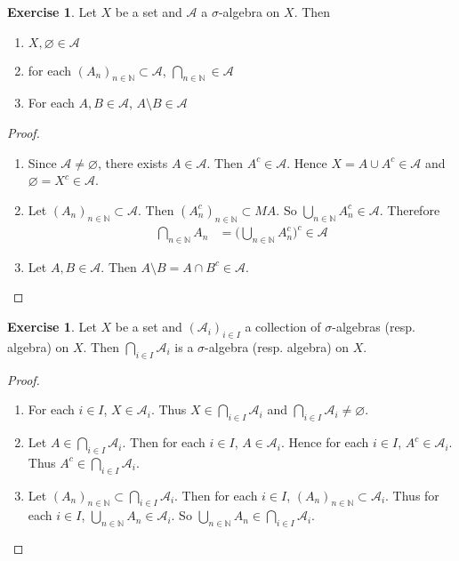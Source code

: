 \documentclass{book}
\theoremstyle{definition}
\newtheorem{ex}[definition]{Exercise}
\newcommand{\sig}{\sigma}
\newcommand{\N}{\mathbb{N}}
\newcommand{\MA}{\mathcal{A}}
\newcommand{\lex}[1]{\label{ex:#1}}
\DeclareMathOperator*{\0}{\mbf{0}}
\DeclareMathOperator*{\1}{\mbf{1}}
\begin{document}
	\begin{ex} \lex{00000} 
		Let $X$ be a set and $\MA$ a $\sig$-algebra on $X$. Then 
		\begin{enumerate}
			\item $X, \varnothing \in \MA$
			\item for each $(A_n)_{n \in \N} \subset \MA$, $\bigcap\limits_{n \in \N} \in \MA$
			\item For each $A, B \in \MA$, $A \setminus B \in \MA$  
		\end{enumerate}
	\end{ex}
	
	\begin{proof}\
		\begin{enumerate}
			\item Since $\MA \neq \varnothing$, there exists $A \in \MA$. Then $A^c \in \MA$. Hence $X = A \cup A^c \in \MA$ and $\varnothing = X^c \in \MA$.
			\item Let $(A_n)_{n \in \N} \subset \MA$. Then $(A_n^c)_{n \in \N} \subset MA$. So $\bigcup\limits_{n \in \N}A_n^c \in \MA$. Therefore \begin{align*}
				\bigcap\limits_{n \in \N}A_n 
				&= \bigg(\bigcup\limits_{n \in \N}A_n^c\bigg)^c \in \MA
			\end{align*}
			\item Let $A,B \in \MA$. Then $A \setminus B = A \cap B^c \in \MA$. 
		\end{enumerate}
	\end{proof}
	
	\begin{ex} \lex{00000} 
		Let $X$ be a set and $(\MA_i)_{i \in I}$ a collection of $\sig$-algebras (resp. algebra) on $X$. Then $\bigcap\limits_{i \in I}\MA_i$ is a $\sig$-algebra (resp. algebra) on $X$.
	\end{ex}
	
	\begin{proof}\
		\begin{enumerate}
			\item For each $i \in I$, $X \in \MA_i$. Thus $X \in \bigcap\limits_{i \in I}\MA_i$ and $\bigcap\limits_{i \in I}\MA_i \neq \varnothing$.
			\item Let $A \in \bigcap\limits_{i \in I}\MA_i$. Then for each $i \in I$, $A \in \MA_i$. Hence for each $i \in I$, $A^c \in \MA_i$. Thus $A^c \in \bigcap\limits_{i \in I}\MA_i$. 
			\item Let $(A_n)_{n \in \N} \subset \bigcap\limits_{i \in I}\MA_i$. Then for each $i \in I$, $(A_n)_{n \in \N} \subset \MA_i$. Thus for each $i \in I$, $\bigcup\limits_{n \in \N}A_n \in \MA_i$. So $\bigcup\limits_{n \in \N}A_n \in \bigcap\limits_{i \in I}\MA_i$.
		\end{enumerate}
	\end{proof}
	
\end{document}

